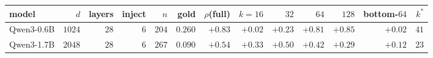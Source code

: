 \begin{tabular}{@{}lrrrrrrrrrrrr@{}}
\toprule
model & $d$ & layers & inject & $n$ & gold & $\rho$(full) & $k{=}16$ & $32$ & $64$ & $128$ & bottom-$64$ & $k^{*}$ \\
\midrule
Qwen3-0.6B & $1024$ & $28$ & $6$ & $204$ & $0.260$ & $+0.83$ & $+0.02$ & $+0.23$ & $+0.81$ & $+0.85$ & $+0.02$ & $41$ \\
Qwen3-1.7B & $2048$ & $28$ & $6$ & $267$ & $0.090$ & $+0.54$ & $+0.33$ & $+0.50$ & $+0.42$ & $+0.29$ & $+0.12$ & $23$ \\
\bottomrule
\end{tabular}
